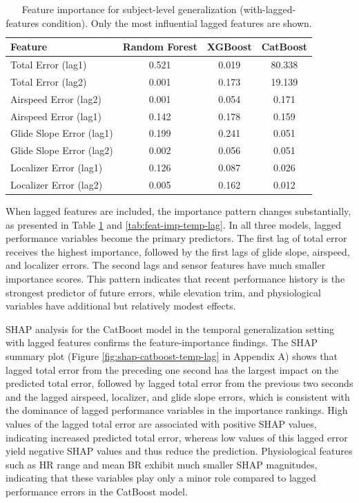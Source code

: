 \documentclass[11pt, a4paper]{article}
\begin{document}
\begin{table}[htbp]
	\caption{Feature importance for subject-level generalization (with-lagged-features condition).
		Only the most influential lagged features are shown.}
	\label{tab:feat-imp-sub-lag}
	\centering
	\small
	\begin{tabular}{lccc}
		\toprule
		Feature & Random Forest & XGBoost & CatBoost \\
		\midrule
		Total Error (lag1)          & 0.521 & 0.019 & 80.338 \\
		Total Error (lag2)          & 0.001 & 0.173 & 19.139 \\
		Airspeed Error (lag2)    & 0.001 & 0.054 &  0.171 \\
		Airspeed Error (lag1)    & 0.142 & 0.178 &  0.159 \\
		Glide Slope Error (lag1) & 0.199 & 0.241 &  0.051 \\
		Glide Slope Error (lag2) & 0.002 & 0.056 &  0.051 \\
		Localizer Error (lag1)   & 0.126 & 0.087 &  0.026 \\
		Localizer Error (lag2)   & 0.005 & 0.162 &  0.012 \\
		\bottomrule
	\end{tabular}
\end{table}

When lagged features are included, the importance pattern changes substantially, as presented in Table \ref{tab:feat-imp-sub-lag} and \ref{tab:feat-imp-temp-lag}. In all three models, lagged performance variables become the primary predictors. The first lag of total error receives the highest importance, followed by the first lags of glide slope, airspeed, and localizer errors. The second lags and sensor features have much smaller importance scores. This pattern indicates that recent performance history is the strongest predictor of future errors, while elevation trim, and physiological variables have additional but relatively modest effects.

SHAP analysis for the CatBoost model in the temporal generalization setting with lagged features confirms the feature‑importance findings. The SHAP summary plot (Figure \ref{fig:shap-catboost-temp-lag} in Appendix A) shows that lagged total error from the preceding one second has the largest impact on the predicted total error, followed by lagged total error from the previous two seconds and the lagged airspeed, localizer, and glide slope errors, which is consistent with the dominance of lagged performance variables in the importance rankings. High values of the lagged total error are associated with positive SHAP values, indicating increased predicted total error, whereas low values of this lagged error yield negative SHAP values and thus reduce the prediction. Physiological features such as HR range and mean BR exhibit much smaller SHAP magnitudes, indicating that these variables play only a minor role compared to lagged performance errors in the CatBoost model.
\end{document}
